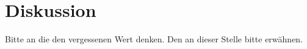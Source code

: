\section{Diskussion}
\label{sec:Diskussion}

Bitte an die den vergessenen Wert denken. Den an dieser Stelle bitte erwähnen.